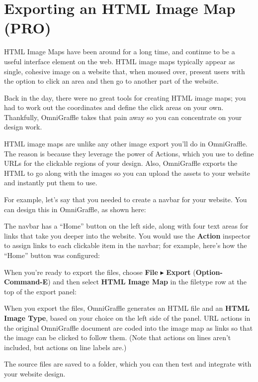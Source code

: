 \documentclass[../main.tex]{subfiles}
\begin{document}
\section{Exporting an HTML Image Map (\texorpdfstring{\textbf{PRO}}{PRO})}

\begin{ogpro}
  HTML Image Maps have been around for a long time, and continue to be a useful interface element
  on the web. HTML image maps typically appear as single, cohesive image on a website that, when
  moused over, present users with the option to click an area and then go to another part of the
  website.

  \begin{ognote}
    Back in the day, there were no great tools for creating HTML image maps; you had to work out
    the coordinates and define the click areas on your own. Thankfully, OmniGraffle takes that
    pain away so you can concentrate on your design work.
  \end{ognote}

  HTML image maps are unlike any other image export you'll do in OmniGraffle. The reason is
  because they leverage the power of Actions, which you use to define URLs for the clickable
  regions of your design. Also, OmniGraffle exports the HTML to go along with the images so
  you can upload the assets to your website and instantly put them to use.

  For example, let's say that you needed to create a navbar for your website. You can design
  this in OmniGraffle, as shown here:


  The navbar has a ``Home'' button on the left side, along with four text areas for links that
  take you deeper into the website. You would use the \textbf{Action} inspector to assign
  links to each clickable item in the navbar; for example, here's how the ``Home'' button was
  configured:


  When you're ready to export the files, choose \textbf{File} $\blacktriangleright$
  \textbf{Export} (\textbf{Option-Command-E}) and then select \textbf{HTML Image Map} in the
  filetype row at the top of the export panel:


  When you export the files, OmniGraffle generates an HTML file and an \textbf{HTML Image Type},
  based on your choice on the left side of the panel. URL actions in the original OmniGraffle
  document are coded into the image map as links so that the image can be clicked to follow
  them. (Note that actions on lines aren't included, but actions on line labels are.)

  The source files are saved to a folder, which you can then test and integrate with your
  website design.
\end{ogpro}
\end{document}
